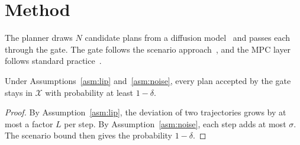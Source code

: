 \section{Method}\label{sec:method}
The planner draws $N$ candidate plans from a diffusion model~\cite{ho2020denoising} and passes
each through the gate. The gate follows the scenario approach~\cite{campi2008exact}, and the
MPC layer follows standard practice~\cite{rawlings2017model}.

\begin{theorem}\label{thm:main}
Under Assumptions~\ref{asm:lip} and~\ref{asm:noise}, every plan accepted by the gate stays in
$\mathcal{X}$ with probability at least $1-\delta$.
\end{theorem}

\begin{proof}
By Assumption~\ref{asm:lip}, the deviation of two trajectories grows by at most a factor $L$
per step. By Assumption~\ref{asm:noise}, each step adds at most $\sigma$. The scenario bound
then gives the probability $1-\delta$.
\end{proof}
